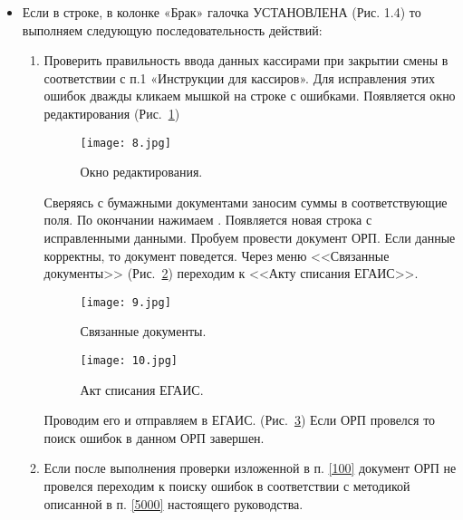 \begin{itemize}
	\item Если в строке, в колонке «Брак»  галочка УСТАНОВЛЕНА (Рис. 1.4) то выполняем следующую последовательность действий:

	\begin{enumerate}[label={\alph*)},font={\color{red!50!black}\bfseries}] \label{100}
			\item Проверить правильность ввода данных кассирами при закрытии смены в соответствии с п.1 «Инструкции для кассиров». Для исправления этих ошибок дважды кликаем мышкой на строке с ошибками. Появляется окно редактирования (Рис.~\ref{ris:8.jpg}) \label{100}	
			
		\begin{figure}[H]
			\texttt{[image: 8.jpg]}
			\caption{Окно редактирования.}
			\label{ris:8.jpg}
		\end{figure}
			Сверяясь с бумажными документами заносим суммы в соответствующие поля. По окончании нажимаем .
			Появляется новая строка с исправленными данными. Пробуем провести документ  ОРП. Если данные корректны, то документ поведется.
			Через меню <<Связанные документы>> (Рис.~\ref{ris:9.jpg})  переходим к <<Акту списания ЕГАИС>>.
		\begin{figure}[H]
			\texttt{[image: 9.jpg]}
			\caption{Связанные документы.}
			\label{ris:9.jpg}
		\end{figure}
	 	\begin{figure}[H]
			\texttt{[image: 10.jpg]}
			\caption{Акт списания ЕГАИС.}
			\label{ris:10.jpg}
		\end{figure}
			Проводим его и отправляем в ЕГАИС. (Рис.~\ref{ris:10.jpg})
			Если ОРП провелся то поиск ошибок в данном ОРП завершен. 
		\item Если после выполнения проверки изложенной в п. \ref{100}   документ ОРП не провелся переходим к поиску ошибок в соответствии с методикой описанной в п. \ref{5000} настоящего руководства. 
	\end{enumerate}
	
\end{itemize}
